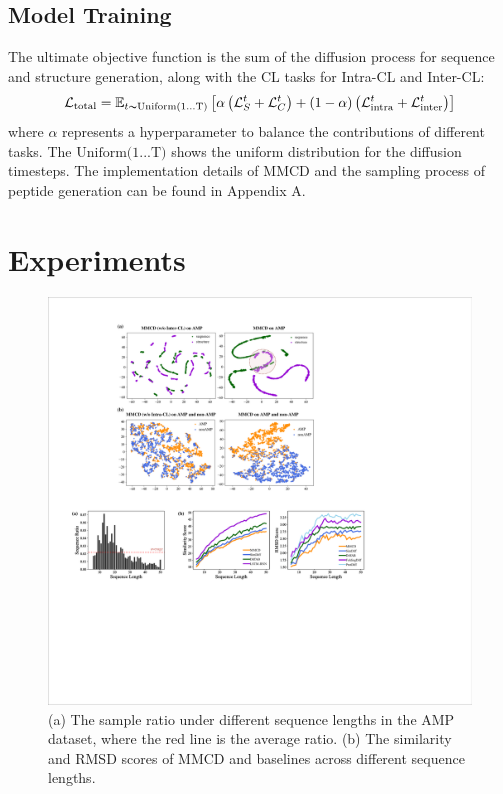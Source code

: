 \documentclass[letterpaper]{article} %
\begin{document}
\subsection{Model Training}
The ultimate objective function is the sum of the diffusion process for sequence and structure generation, along with the CL tasks for Intra-CL and Inter-CL:
{\small
\begin{equation}
\mathcal{L}_\text{total}=\mathbb{E}_{t\thicksim \text{Uniform(1...T)}}\left[\alpha\left(\mathcal{L}_S^t+\mathcal{L}_C^t\right)+\left(1-\alpha\right)\left(\mathcal{L}_\text{intra}^t+\mathcal{L}_\text{inter}^t\right)\right]
\end{equation}
}where $\alpha$ represents a hyperparameter to balance the contributions of different tasks. The $\text{Uniform(1...T)}$ shows the uniform distribution for the diffusion timesteps. The implementation details of MMCD and the sampling process of peptide generation can be found in Appendix A.

\section{Experiments}
\begin{figure}[ht]
\centering
\includegraphics[scale=0.4]{fig2.pdf}
\caption{(a) The sample ratio under different sequence lengths in the AMP dataset, where the red line is the average ratio. (b) The similarity and RMSD scores of MMCD and baselines across different sequence lengths.}
\end{figure}
\end{document}
